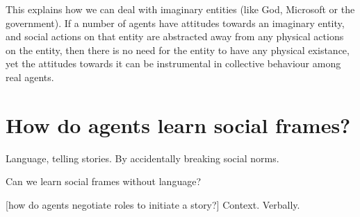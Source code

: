\documentclass[a4paper]{article}
\begin{document}
This explains how we can deal with imaginary entities (like God, Microsoft or the government). If a number of agents have attitudes towards an imaginary entity, and social actions on that entity are abstracted away from any physical actions on the entity, then there is no need for the entity to have any physical existance, yet the attitudes towards it can be instrumental in collective behaviour among real agents.


\section{How do agents learn social frames?}

Language, telling stories. By accidentally breaking social norms.

Can we learn social frames without language?

[how do agents negotiate roles to initiate a story?]
Context. Verbally.
\end{document}

